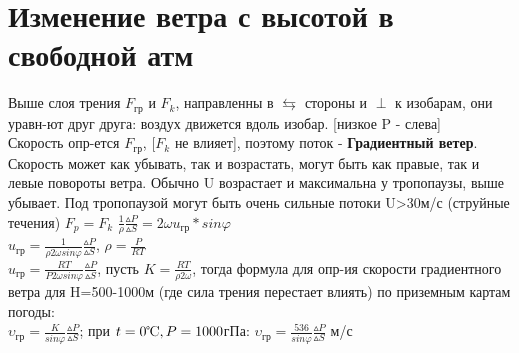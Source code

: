 
\section{Изменение ветра с высотой в свободной атм}
Выше слоя трения $F_{\text{гр}}$ и $F_k$, направленны в $\leftrightarrows$ стороны и $\perp$ к изобарам, они уравн-ют друг друга: воздух движется вдоль изобар. [низкое P - слева]\\
Скорость опр-ется $F_{\text{гр}}$, [$F_k$ не влияет], поэтому поток - \textbf{Градиентный ветер}.\\
Скорость может как убывать, так и возрастать, могут быть как правые, так и левые повороты ветра. Обычно U возрастает и максимальна у тропопаузы, выше убывает. Под тропопаузой могут быть  очень сильные потоки U>30м/с (струйные течения)
$F_p=F_k$ \hspace{5ex} $ \frac{1}{\rho}\frac{\vartriangle P}{\vartriangle S}=2\omega u_{\text{гр}}*sin\varphi $\\
$ u_{\text{гр}}=\frac{1}{\rho 2\omega sin\varphi}\frac{\vartriangle P}{\vartriangle S} $, $\rho=\frac{P}{RT}$\\
$ u_{\text{гр}}=\frac{RT}{P 2\omega sin\varphi}\frac{\vartriangle P}{\vartriangle S} $,
пусть $K=\frac{RT}{\rho 2\omega}$, тогда формула для опр-ия скорости градиентного ветра для H=500-1000м (где сила трения перестает влиять) по приземным картам погоды:\\
$ \upsilon_{\text{гр}}=\frac{K}{sin\varphi}\frac{\vartriangle P}{\vartriangle S} $;
при $t=0\celsius, P=1000$гПа: $ \upsilon_{\text{гр}}=\frac{536}{sin\varphi}\frac{\vartriangle P}{\vartriangle S} $ м/с
